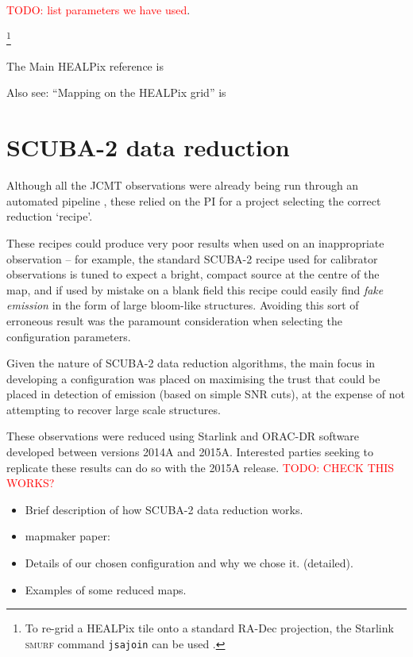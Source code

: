 \documentclass[usenatbib]{mn2e}
\newcommand{\todo}[1]{\textcolor{red}{TODO: #1}}
\newcommand{\ascl}[1]{\href{http://www.ascl.net/#1}{ascl:#1}}
\begin{document}
\todo{list parameters we have used}.

\footnote{To re-grid a HEALPix tile onto a standard RA-Dec projection,
  the Starlink \textsc{smurf} command \texttt{jsajoin} can be used
  \citep[][\ascl{1310.007}]{SUN258}.}

The Main HEALPix reference is \citep{Gorski2005}

Also see: ``Mapping on the HEALPix grid'' is \citep{Calabretta2007}



\section{SCUBA-2 data reduction}
Although all the JCMT observations were already being run through an
automated pipeline \citep{2011scuba2dr,2015oracdr}, these relied on the PI for a
project selecting the correct reduction `recipe'.

These recipes could produce very poor results when used on an
inappropriate observation -- for example, the standard SCUBA-2 recipe
used for calibrator observations is tuned to expect a bright, compact
source at the centre of the map, and if used by mistake on a blank
field this recipe could easily find \emph{fake emission} in the form
of large bloom-like structures. Avoiding this sort of erroneous result
was the paramount consideration when selecting the configuration
parameters.

Given the nature of SCUBA-2 data reduction algorithms, the main focus
in developing a configuration was placed on maximising the trust that
could be placed in detection of emission (based on simple SNR cuts),
at the expense of not attempting to recover large scale
structures.

These observations were reduced using Starlink and
ORAC-DR software developed between versions 2014A and
2015A. Interested parties seeking to replicate these results can do
so with the 2015A release. \todo{CHECK THIS WORKS?}

\begin{itemize}
\item Brief description of how SCUBA-2 data reduction works.
\item mapmaker paper: \citep{Chapin2013}
\item Details of our chosen configuration and why we chose it. (detailed).
\item Examples of some reduced maps.
\end{itemize}
\end{document}
